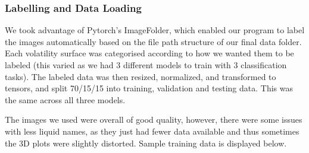 \documentclass[10pt]{article}
\begin{document}
\subsubsection{Labelling and Data Loading}

We took advantage of Pytorch's ImageFolder, which enabled our program to label the images automatically based on the file path structure of our final data folder. Each volatility surface was categorised according to how we wanted them to be labeled (this varied as we had 3 different models to train with 3 classification tasks). The labeled data was then resized, normalized, and transformed to tensors, and split 70/15/15 into training, validation and testing data. This was the same across all three models.

The images we used were overall of good quality, however, there were some issues with less liquid names, as they just had fewer data available and thus sometimes the 3D plots were slightly distorted. Sample training data is displayed below.
\end{document}
